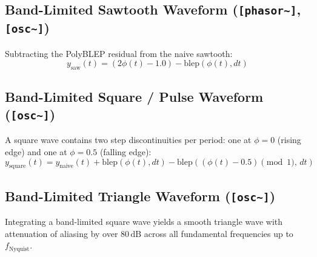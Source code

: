 \documentclass[11pt,a4paper]{article}
\begin{document}
\subsection{Band-Limited Sawtooth Waveform (\texttt{[phasor\textasciitilde{}]}, \texttt{[osc\textasciitilde{}]})}
Subtracting the PolyBLEP residual from the naive sawtooth:
\begin{equation}
y_{\text{saw}}(t) = (2\phi(t) - 1.0) - \text{blep}(\phi(t), dt)
\end{equation}

\subsection{Band-Limited Square / Pulse Waveform (\texttt{[osc\textasciitilde{}]})}
A square wave contains two step discontinuities per period: one at $\phi = 0$ (rising edge) and one at $\phi = 0.5$ (falling edge):
\begin{equation}
y_{\text{square}}(t) = y_{\text{naive}}(t) + \text{blep}(\phi(t), dt) - \text{blep}\left((\phi(t) - 0.5) \pmod{1}, \, dt\right)
\end{equation}

\subsection{Band-Limited Triangle Waveform (\texttt{[osc\textasciitilde{}]})}
Integrating a band-limited square wave yields a smooth triangle wave with attenuation of aliasing by over $80\,\text{dB}$ across all fundamental frequencies up to $f_{\text{Nyquist}}$.
\end{document}
